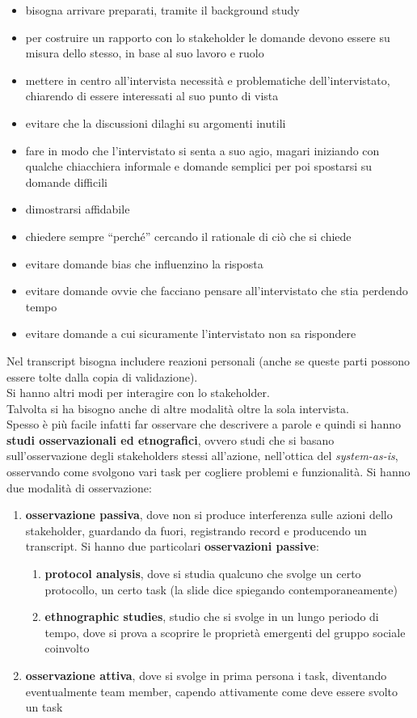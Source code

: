 \documentclass[a4paper,12pt, oneside]{book}
\begin{document}
\begin{itemize}
  \item bisogna arrivare preparati, tramite il background study
  \item per costruire un rapporto con lo stakeholder le domande devono essere su
  misura dello stesso, in base al suo lavoro e ruolo
  \item mettere in centro all'intervista necessità e problematiche
  dell'intervistato, chiarendo di essere interessati al suo punto di vista
  \item evitare che la discussioni dilaghi su argomenti inutili
  \item fare in modo che l'intervistato si senta a suo agio, magari iniziando
  con qualche chiacchiera informale e domande semplici per poi spostarsi su
  domande difficili
  \item dimostrarsi affidabile
  \item chiedere sempre ``perché'' cercando il rationale di ciò che si chiede
  \item evitare domande bias che influenzino la risposta
  \item evitare domande ovvie che facciano pensare all'intervistato che stia
  perdendo tempo
  \item evitare domande a cui sicuramente l'intervistato non sa rispondere
\end{itemize}
Nel transcript bisogna includere reazioni personali (anche se queste parti
possono essere tolte dalla copia di validazione).\\
Si hanno altri modi per interagire con lo stakeholder.\\
Talvolta si ha bisogno anche di altre modalità oltre la sola intervista.\\
Spesso è più facile infatti far osservare che descrivere a parole e quindi si
hanno \textbf{studi osservazionali ed etnografici}, ovvero studi che si basano
sull'osservazione degli stakeholders stessi all'azione, nell'ottica del
\textit{system-as-is}, osservando come svolgono vari task per cogliere problemi
e funzionalità. Si hanno due modalità di osservazione:
\begin{enumerate}
  \item \textbf{osservazione passiva}, dove non si produce interferenza sulle
  azioni dello stakeholder, guardando da fuori, registrando record e producendo
  un transcript. Si hanno due particolari \textbf{osservazioni passive}:
  \begin{enumerate}
    \item \textbf{protocol analysis}, dove si studia qualcuno che svolge un
    certo protocollo, un certo task (la slide dice spiegando contemporaneamente)
    \item \textbf{ethnographic studies}, studio che si svolge in un lungo
    periodo di tempo, dove si prova a scoprire le proprietà emergenti del gruppo
    sociale coinvolto
  \end{enumerate}
  \item \textbf{osservazione attiva}, dove si svolge in prima persona i task,
  diventando eventualmente team member, capendo attivamente come deve essere
  svolto un task
\end{enumerate}
\end{document}
